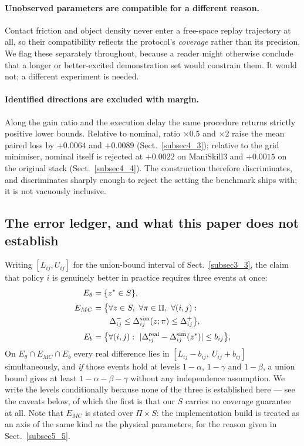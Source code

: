 \documentclass[pdflatex,iicol,sn-apa]{sn-jnl}
\theoremstyle{remark}
\begin{document}
\begin{appendices}
\paragraph{Unobserved parameters are compatible for a different reason.}
Contact friction and object density never enter a free-space replay trajectory at all, so their
compatibility reflects the protocol's \emph{coverage} rather than its precision. We flag these
separately throughout, because a reader might otherwise conclude that a longer or better-excited
demonstration set would constrain them. It would not; a different experiment is needed.

\paragraph{Identified directions are excluded with margin.}
Along the gain ratio and the execution delay the same procedure returns strictly positive lower
bounds. Relative to nominal, ratio $\times 0.5$ and $\times 2$ raise the mean paired loss by
$+0.0064$ and $+0.0089$ (Sect.~\ref{subsec4_3}); relative to the grid minimiser, nominal itself is
rejected at $+0.0022$ on ManiSkill3 and $+0.0015$ on the original stack
(Sect.~\ref{subsec4_4}). The construction therefore discriminates, and discriminates sharply enough
to reject the setting the benchmark ships with; it is not vacuously inclusive.

\subsection{The error ledger, and what this paper does not establish}\label{secA2}

Writing $[L_{ij}, U_{ij}]$ for the union-bound interval of Sect.~\ref{subsec3_3}, the claim that
policy $i$ is genuinely better in practice requires three events at once:
\begin{align}
E_\theta &= \{ z^* \in S \}, \\[2pt]
E_{MC}   &= \big\{ \forall z \in S,\ \forall \pi \in \Pi,\ \forall (i,j): \notag \\
         &\qquad \Delta^-_{ij} \le \Delta^{\mathrm{sim}}_{ij}(z; \pi)
                 \le \Delta^+_{ij} \big\}, \\[2pt]
E_b      &= \big\{ \forall (i,j):\ |\Delta^{\mathrm{real}}_{ij} -
             \Delta^{\mathrm{sim}}_{ij}(z^*)| \le b_{ij} \big\},
\end{align}
On $E_\theta \cap E_{MC} \cap E_b$ every real difference lies in
$[L_{ij} - b_{ij},\ U_{ij} + b_{ij}]$ simultaneously, and \emph{if} those events hold at levels
$1-\alpha$, $1-\gamma$ and $1-\beta$, a union bound gives at least $1 - \alpha - \beta - \gamma$
without any independence assumption. We write the levels conditionally because none of the three is
established here --- see the caveats below, of which the first is that our $S$ carries no coverage
guarantee at all. Note that $E_{MC}$ is stated over $\Pi \times S$: the implementation build is
treated as an axis of the same kind as the physical parameters, for the reason given in
Sect.~\ref{subsec5_5}.


\end{appendices}
\end{document}
